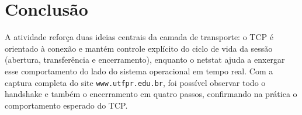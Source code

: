 \documentclass[12pt,a4paper]{article}
\begin{document}
\section*{Conclusão}

A atividade reforça duas ideias centrais da camada de transporte: o TCP é orientado à conexão e mantém controle explícito do ciclo de vida da sessão (abertura, transferência e encerramento), enquanto o netstat ajuda a enxergar esse comportamento do lado do sistema operacional em tempo real. Com a captura completa do site \texttt{www.utfpr.edu.br}, foi possível observar todo o handshake e também o encerramento em quatro passos, confirmando na prática o comportamento esperado do TCP.
\end{document}
